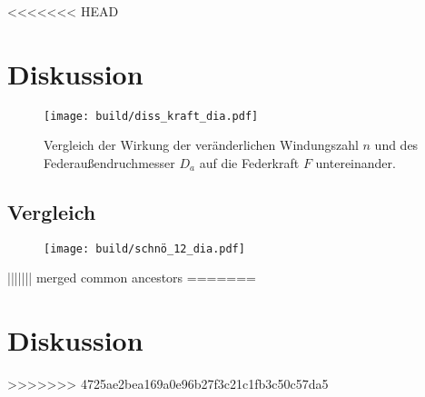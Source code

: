 <<<<<<< HEAD
\newpage
\section{Diskussion}

\begin{figure}
    \center
    \texttt{[image: build/diss\_kraft\_dia.pdf]}
    \caption{
        Vergleich der Wirkung der veränderlichen Windungszahl $n$ und
        des Federaußendruchmesser $D_a$ auf die Federkraft $F$ untereinander.
    }
\end{figure}

\subsection{Vergleich}

\begin{figure}[H]
    \center
    \texttt{[image: build/schnö\_12\_dia.pdf]}
    \caption{}
\end{figure}

\label{sec:Diskussion}
||||||| merged common ancestors
=======
\newpage
\section{Diskussion}
\label{sec:Diskussion}
>>>>>>> 4725ae2bea169a0e96b27f3c21c1fb3c50c57da5
